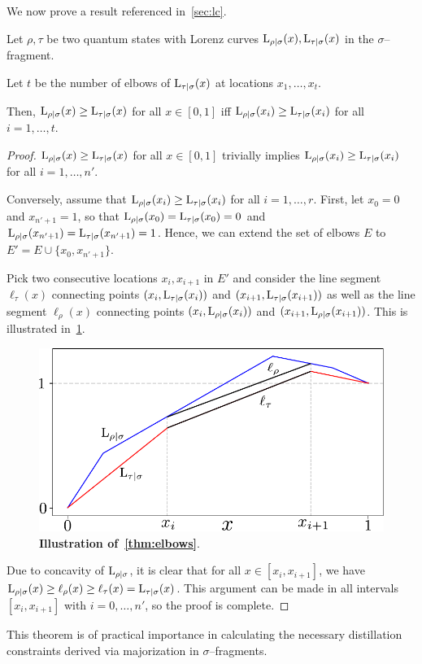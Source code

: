 We now prove a result referenced in~\cref{sec:lc}.
\begin{proposition}\label{thm:elbows}
	Let $\rho, \tau$ be two quantum states with Lorenz curves ${{\rm{L}}_{\rho|\sigma}}(x), {{\rm{L}}_{\tau|\sigma}}(x)$ in the $\sigma$--fragment.
	
	Let $t$ be the number of elbows of ${{\rm{L}}_{\tau|\sigma}}(x)$ at locations $x_1, \dots, x_t$.
	
	Then, ${{\rm{L}}_{\rho|\sigma}}(x) \geq {{\rm{L}}_{\tau|\sigma}}(x)$ for all $x \in [0,1]$ iff ${{\rm{L}}_{\rho|\sigma}}(x_{i}) \geq {{\rm{L}}_{\tau|\sigma}}(x_{i})$ for all $i =1,\dots,t$.
\end{proposition}
\begin{proof}	
	${{\rm{L}}_{\rho|\sigma}}(x) \geq {{\rm{L}}_{\tau|\sigma}}(x)$ for all $x \in [0,1]$ trivially implies ${{\rm{L}}_{\rho|\sigma}}(x_{i}) \geq {{\rm{L}}_{\tau|\sigma}}(x_{i})$ for all $i = 1,\dots,n'$.
	
	Conversely, assume that ${{\rm{L}}_{\rho|\sigma}}(x_{i}) \geq {{\rm{L}}_{\tau|\sigma}}(x_{i})$ for all $i = 1,\dots,r$.
	First, let $x_0 = 0$ and $x_{n'+1} = 1$, so that ${{\rm{L}}_{\rho|\sigma}}(x_0) = {{\rm{L}}_{\tau|\sigma}}(x_0) = 0$ and ${{\rm{L}}_{\rho|\sigma}}(x_{n'+1}) = {{\rm{L}}_{\tau|\sigma}}(x_{n'+1}) = 1$.
	Hence, we can extend the set of elbows $E$ to $E' = E \cup \{x_0, x_{n'+1}\}$.
	
	Pick two consecutive locations $x_{i}, x_{i+1}$ in $E'$ and consider the line segment $\ell_\tau(x)$ connecting points $(x_{i}, {{\rm{L}}_{\tau|\sigma}}(x_{i}))$ and $(x_{i+1}, {{\rm{L}}_{\tau|\sigma}}(x_{i+1}))$ as well as the line segment $\ell_\rho(x)$ connecting points $(x_{i}, {{\rm{L}}_{\rho|\sigma}}(x_{i}))$ and $(x_{i+1}, {{\rm{L}}_{\rho|\sigma}}(x_{i+1}))$.
	This is illustrated in~\cref{fig:elbows_proof}.
\begin{figure}[h]
    \centering
    \includegraphics[scale=0.6]{figs/elbows_proof.pdf}
    \caption{\textbf{Illustration of~\cref{thm:elbows}}.
    }
    \label{fig:elbows_proof}
\end{figure}

	Due to concavity of ${{\rm{L}}_{\rho|\sigma}}$, it is clear that for all $x \in [x_{i}, x_{i+1}]$, we have ${{\rm{L}}_{\rho|\sigma}}(x) \geq \ell_\rho(x) \geq \ell_\tau(x) = {{\rm{L}}_{\tau|\sigma}}(x)$.
	This argument can be made in all intervals $[x_{i}, x_{i+1}]$ with $i=0,\dots,n'$, so the proof is complete.
\end{proof}
This theorem is of practical importance in calculating the necessary distillation constraints derived via majorization in $\sigma$--fragments.

